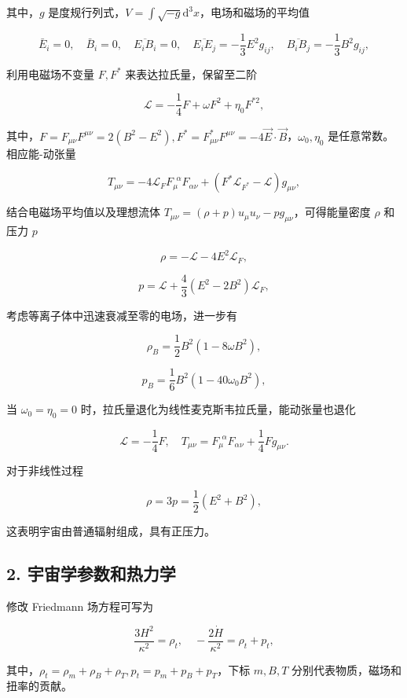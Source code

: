 \documentclass[aps,prl,preprint,groupedaddress,showkeys]{revtex4-2}
\begin{document}
其中，$g$ 是度规行列式，$\displaystyle{V=\int\sqrt{-g}\mathrm{d}^3 x } $，电场和磁场的平均值

$$
\bar{E}_i = 0,\quad
\bar{B}_i = 0,\quad
\overline{E_i B_i} = 0,\quad
\overline{E_i E_j} = -\frac{1 }{3 } E^2 g_{ij},\quad
\overline{B_i B_j} = -\frac{1 }{3 } B^2 g_{ij},
$$

利用电磁场不变量 $F,F^*$ 来表达拉氏量，保留至二阶

$$
\mathcal{L}=-\frac{1 }{4 } F + \omega F^2 + \eta_0 F^{*2},
$$

其中，$F=F_{\mu\nu} F^{\mu\nu}=2(B^2-E^2),F^*=F_{\mu\nu}^*F^{\mu\nu}=-4\vec{E}\cdot\vec{B}$，$\omega_0,\eta_0$ 是任意常数。相应能-动张量

$$
T_{\mu\nu}
=-4\mathcal{L}_F F_\mu^{~~\alpha} F_{\alpha\nu} + \left(F^* \mathcal{L}_{F^*} - \mathcal{L} \right) g_{\mu\nu},
$$

结合电磁场平均值以及理想流体 $T_{\mu\nu}=(\rho+p)u_\mu u_\nu-p g_{\mu\nu}$，可得能量密度 $\rho$ 和压力 $p$

$$
\rho = -\mathcal{L} - 4E^2 \mathcal{L}_F,
$$

$$
p = \mathcal{L} + \frac{4 }{3 } \left(E^2-2B^2 \right)\mathcal{L}_F,
$$

考虑等离子体中迅速衰减至零的电场，进一步有

$$
\rho_B = \frac{1 }{2 } B^2\left(1-8\omega B^2 \right),
$$


$$
p_B = \frac{1 }{6 } B^2 \left(1-40\omega_0 B^2 \right),
$$

当 $\omega_0=\eta_0=0$ 时，拉氏量退化为线性麦克斯韦拉氏量，能动张量也退化

$$
\mathcal{L} = -\frac{1 }{4 } F,\quad
T_{\mu\nu} = F_\mu^{~~\alpha} F_{\alpha\nu} + \frac{1 }{4 } F g_{\mu\nu}.
$$

对于非线性过程

$$
\rho = 3p = \frac{1 }{2 } \left(E^2 + B^2 \right),
$$

这表明宇宙由普通辐射组成，具有正压力。

\subsection{2. 宇宙学参数和热力学}

修改 Friedmann 场方程可写为

$$
\frac{3 H^2 }{\kappa^2 } = \rho_t,\quad
-\frac{2\dot{H} }{\kappa^2 }  = \rho_t + p_t,
$$

其中，$\rho_t=\rho_m+\rho_B+\rho_T,p_t=p_m+p_B+p_T$，下标 $m,B,T$ 分别代表物质，磁场和扭率的贡献。
\end{document}
